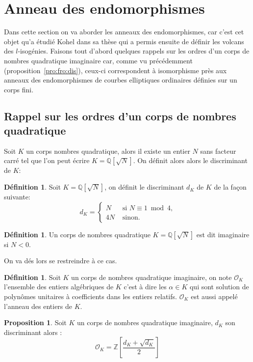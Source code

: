 \documentclass[10pt,a4paper]{book}
\theoremstyle{plain}
\theoremstyle{definition}
\theoremstyle{definition}
\theoremstyle{definition}
\theoremstyle{definition}
\newtheorem{prop}[thm]{Proposition}
\theoremstyle{definition}
\newtheorem{defi}[thm]{Définition}
\theoremstyle{remark}
\theoremstyle{remark}
\theoremstyle{definition}
\begin{document}
\section{Anneau des endomorphismes}
\label{sec:ann:end}
Dans cette section on va aborder les anneaux des endomorphismes, car c'est cet 
objet qu'a étudié Kohel dans sa thèse \cite{Kohel96} qui a permis ensuite de 
définir les volcans des $l$-isogénies. Faisons tout d'abord quelques rappels 
sur les ordres d'un corps de nombres quadratique imaginaire car, comme vu précédemment 
(proposition~\ref{pro:fro:dis}), ceux-ci correspondent à isomorphisme près aux 
anneaux des endomorphismes de courbes elliptiques ordinaires définies sur un 
corps fini.

\subsection{Rappel sur les ordres d'un corps de nombres quadratique}

Soit $K$ un corps nombres quadratique, alors il existe un entier $N$ sans facteur carré tel que l'on peut écrire $K=\mathbb{Q}[\sqrt{N}]$. On définit alors alors le discriminant de $K$:
\begin{defi}
\label{def:dis:dK}
Soit $K=\mathbb{Q}[\sqrt{N}]$, on définit le discriminant $d_K$ de $K$ de la façon suivante: 
\begin{equation*}
d_K=\begin{cases}
N & \text{ si }  N \equiv 1 \bmod 4\text{,}\\
4N & \text{ sinon.}
\end{cases}
\end{equation*}
\end{defi}

\begin{defi}
Un corps de nombres quadratique $K=\mathbb{Q}[\sqrt{N}]$ est dit imaginaire si $N<0$. 
\end{defi}

On va dés lors se restreindre à ce cas.

\begin{defi}
Soit $K$ un corps de nombres quadratique imaginaire, on note $\mathcal{O}_K$ l'ensemble 
des entiers algébriques de $K$ c'est à dire les $\alpha \in K$ qui sont 
solution de polynômes unitaires à coefficients dans les entiers relatifs. 
$\mathcal{O}_K$ est aussi appelé l'anneau des entiers de $K$.
\end{defi}

\begin{prop}
Soit $K$ un corps de nombres quadratique imaginaire, $d_K$ son discriminant alors : 
\[ \mathcal{O}_K=\mathbb{Z} \left[ \frac{d_K+\sqrt{d_K}}{2} \right]  \]  
\end{prop}
\end{document}
